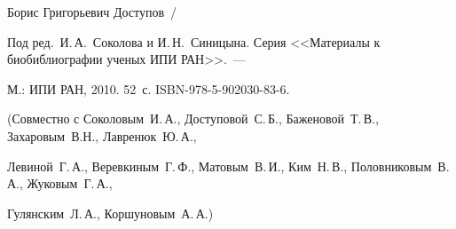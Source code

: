 Борис Григорьевич Доступов~/


Под ред.\ И.\,А.~Соколова и И.\,Н.~Синицына. Серия <<Материалы к биобиблиографии ученых ИПИ РАН>>.~---


М.: ИПИ РАН, 2010. 52~с. ISBN-978-5-902030-83-6.


(Совместно с Соколовым~И.\,А., Доступовой~С.\,Б., Баженовой~Т.\,В., Захаровым~В.Н., Лавренюк~Ю.\,А.,


Левиной~Г.\,А., Веревкиным~Г.\,Ф., Матовым~В.\,И., Ким~Н.\,В., Половниковым~В.\,А., Жуковым~Г.\,А.,


Гулянским~Л.\,А., Коршуновым~А.\,А.)


